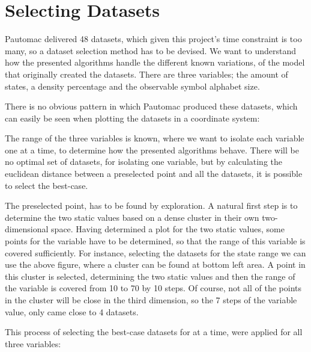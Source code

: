\section{Selecting Datasets}
Pautomac delivered 48 datasets, which given this project's time constraint is too many, so a dataset selection method has to be devised. We want to understand how the presented algorithms handle the different known variations, of the model that originally created the datasets. There are three variables; the amount of states, a density percentage and the observable symbol alphabet size.

There is no obvious pattern in which Pautomac produced these datasets, which can easily be seen when plotting the datasets in a coordinate system:


The range of the three variables is known, where we want to isolate each variable one at a time, to determine how the presented algorithms behave. There will be no optimal set of datasets, for isolating one variable, but by calculating the euclidean distance between a preselected point and all the datasets, it is possible to select the best-case.

The preselected point, has to be found by exploration. A natural first step is to determine the two static values based on a dense cluster in their own two-dimensional space. Having determined a plot for the two static values, some points for the variable have to be determined, so that the range of this variable is covered sufficiently. For instance, selecting the datasets for the state range we can use the above figure, where a cluster can be found at bottom left area. A point in this cluster is selected, determining the two static values and then the range of the variable is covered from 10 to 70 by 10 steps. Of course, not all of the points in the cluster will be close in the third dimension, so the 7 steps of the variable value, only came close to 4 datasets.

This process of selecting the best-case datasets for  at a time, were applied for all three variables:

